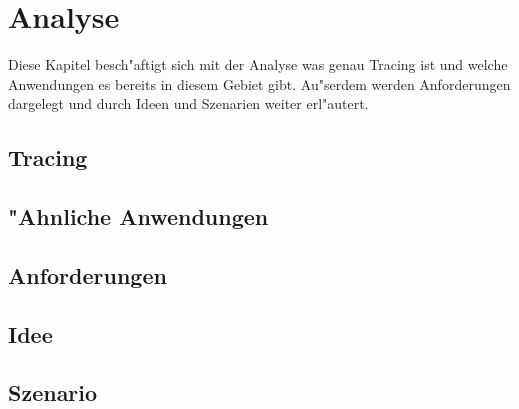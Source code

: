 
\chapter{Analyse}

Diese Kapitel besch"aftigt sich mit der Analyse was genau Tracing ist und welche Anwendungen es bereits in diesem Gebiet gibt. Au"serdem werden Anforderungen dargelegt und durch Ideen und Szenarien weiter erl"autert.

\section{Tracing} 



\section{"Ahnliche Anwendungen} 



\section{Anforderungen} 
\label{sec:anforderungen}



\section{Idee} 



\section{Szenario} 

